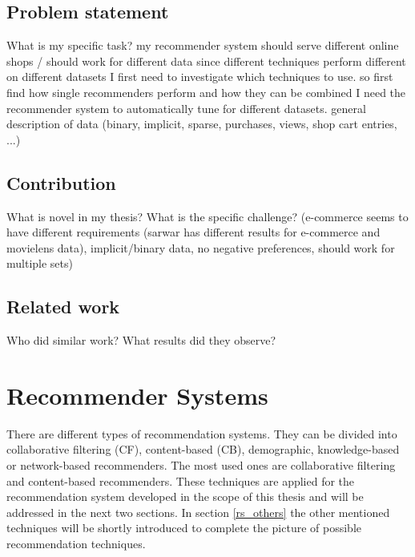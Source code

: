 \documentclass[10pt]{reportMaster}
\begin{document}


\section{Problem statement}
What is my specific task?
my recommender system should serve different online shops / should work for different data
since different techniques perform different on different datasets I first need to investigate which techniques to use.
so first find how single recommenders perform and how they can be combined
I need the recommender system to automatically tune for different datasets.
general description of data (binary, implicit, sparse, purchases, views, shop cart entries, ...)

\section{Contribution}
What is novel in my thesis?
What is the specific challenge? (e-commerce seems to have different requirements (sarwar has different results for e-commerce and movielens data), implicit/binary data, no negative preferences, should work for multiple sets)

\section{Related work}
Who did similar work?
What results did they observe?










\chapter{Recommender Systems}
There are different types of recommendation systems.
They can be divided into collaborative filtering (CF), content-based (CB), demographic, knowledge-based or network-based recommenders. %
The most used ones are collaborative filtering and content-based recommenders.
These techniques are applied for the recommendation system developed in the scope of this thesis and will be addressed in the next two sections.
In section \ref{rs_others} the other mentioned techniques will be shortly introduced to complete the picture of possible recommendation techniques.
\end{document}
